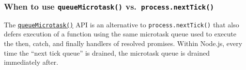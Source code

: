 \begin{Shaded}
\begin{Highlighting}[]
\OperatorTok{=} \NormalTok{(}\NormalTok{)}\OperatorTok{;}

 \OperatorTok{,}
    \OperatorTok{;}
    \OperatorTok{;}
\NormalTok{  \}}

\NormalTok{(}\OperatorTok{,}\OperatorTok{;}
\NormalTok{\}}
\end{Highlighting}
\end{Shaded}

\subsubsection{\texorpdfstring{When to use \texttt{queueMicrotask()}
vs.~\texttt{process.nextTick()}}{When to use queueMicrotask() vs.~process.nextTick()}}\label{when-to-use-queuemicrotask-vs.-process.nexttick}

The \href{globals.md\#queuemicrotaskcallback}{\texttt{queueMicrotask()}}
API is an alternative to \texttt{process.nextTick()} that also defers
execution of a function using the same microtask queue used to execute
the then, catch, and finally handlers of resolved promises. Within
Node.js, every time the ``next tick queue'' is drained, the microtask
queue is drained immediately after.

\begin{Shaded}
\begin{Highlighting}[]
 \OperatorTok{;}

\NormalTok{()}\NormalTok{(() }\KeywordTok{=\textgreater{}} \NormalTok{(}\NormalTok{))}\OperatorTok{;}
\NormalTok{(() }\KeywordTok{=\textgreater{}} \NormalTok{(}\NormalTok{))}\OperatorTok{;}
\NormalTok{(() }\KeywordTok{=\textgreater{}} \NormalTok{(}\NormalTok{))}\OperatorTok{;}
\end{Highlighting}
\end{Shaded}

